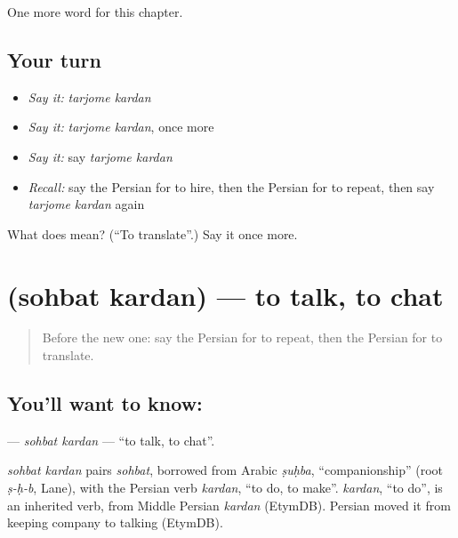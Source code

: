 \begin{grammarlens}[title={What you've built}]
One more word for this chapter.
\end{grammarlens}

\subsection*{Your turn}
\begin{itemize}
\raggedright
  \item \emph{Say it:} \emph{tarjome kardan}
  \item \emph{Say it:} \emph{tarjome kardan}, once more
  \item \emph{Say it:} say \emph{tarjome kardan}
  \item \emph{Recall:} say the Persian for to hire, then the Persian for to repeat, then say \emph{tarjome kardan} again
\end{itemize}

\begin{tcolorbox}[breakable,colback=teal!4,colframe=teal!35!black,title={Before you move on}]
What does   mean? (\textquotedblleft{}To translate\textquotedblright{}.) Say it once more.
\end{tcolorbox}
\section[\texorpdfstring{\fa{صحبت} \fa{کردن} (sohbat kardan)}{صحبت کردن (sohbat kardan)}]{  (sohbat kardan) — to talk, to chat}

\label{lesson:FA-C182-sohbat-kardan}



\begin{quote}
Before the new one: say the Persian for to repeat, then the Persian for to translate.
\end{quote}

\subsection*{You'll want to know:  }
\textbf{ } — \emph{sohbat kardan} — \textquotedblleft{}to talk, to chat\textquotedblright{}.

\begin{cousinweb}
\emph{sohbat kardan} pairs \emph{sohbat}, borrowed from Arabic \emph{ṣuḥba}, \textquotedblleft{}companionship\textquotedblright{} (root \emph{ṣ-ḥ-b}, Lane), with the Persian verb \emph{kardan}, \textquotedblleft{}to do, to make\textquotedblright{}. \emph{kardan}, \textquotedblleft{}to do\textquotedblright{}, is an inherited verb, from Middle Persian \emph{kardan} (EtymDB). Persian moved it from keeping company to talking (EtymDB).
\end{cousinweb}

